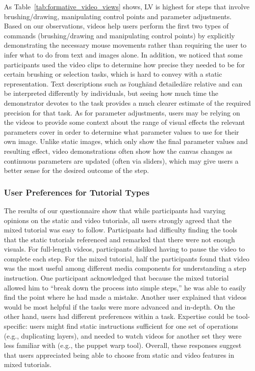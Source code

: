 As Table~\ref{tab:formative_video_views} shows, LV is highest for steps that involve brushing/drawing, manipulating control points and parameter adjustments. Based on our observations, videos help users perform the first two types of commands (brushing/drawing and manipulating control points) by explicitly demonstrating the necessary mouse movements rather than requiring the user to infer what to do from text and images alone. In addition, we noticed that some participants used the video clips to determine how precise they needed to be for certain brushing or selection tasks, which is hard to convey with a static representation. Text descriptions such as \"rough\" and \"detailed\" are relative and can be interpreted differently by individuals, but seeing how much time the demonstrator devotes to the task provides a much clearer estimate of the required precision for that task. As for parameter adjustments, users may be relying on the videos to provide some context about the range of visual effects the relevant parameters cover in order to determine what parameter values to use for their own image. Unlike static images, which only show the final parameter values and resulting effect, video demonstrations often show how the canvas changes as continuous parameters are updated (often via sliders), which may give users a better sense for the desired outcome of the step.

\subsubsection{User Preferences for Tutorial Types}
The results of our questionnaire show that while participants had varying opinions on the static and video tutorials, all users strongly agreed that the mixed tutorial was easy to follow. Participants had difficulty finding the tools that the static tutorials referenced and remarked that there were not enough visuals. For full-length videos, participants disliked having to pause the video to complete each step. For the mixed tutorial, half the participants found that video was the most useful among different media components for understanding a step instruction. One participant acknowledged that because the mixed tutorial allowed him to “break down the process into simple steps,” he was able to easily find the point where he had made a mistake. Another user explained that videos would be most helpful if the tasks were more advanced and in-depth. On the other hand, users had different preferences within a task. Expertise could be tool-specific: users might find static instructions sufficient for one set of operations (e.g., duplicating layers), and needed to watch videos for another set they were less familiar with (e.g., the puppet warp tool). Overall, these responses suggest that users appreciated being able to choose from static and video features in mixed tutorials.


